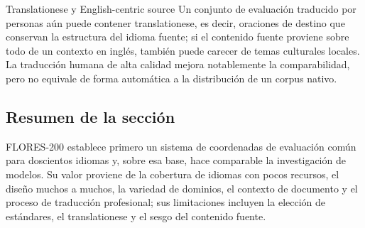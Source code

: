 \begin{warningbox}{Translationese y English-centric source}
Un conjunto de evaluación traducido por personas aún puede contener translationese, es decir, oraciones de destino que conservan la estructura del idioma fuente; si el contenido fuente proviene sobre todo de un contexto en inglés, también puede carecer de temas culturales locales. La traducción humana de alta calidad mejora notablemente la comparabilidad, pero no equivale de forma automática a la distribución de un corpus nativo.
\end{warningbox}

\subsection{Resumen de la sección}

FLORES-200 establece primero un sistema de coordenadas de evaluación común para doscientos idiomas y, sobre esa base, hace comparable la investigación de modelos. Su valor proviene de la cobertura de idiomas con pocos recursos, el diseño muchos a muchos, la variedad de dominios, el contexto de documento y el proceso de traducción profesional; sus limitaciones incluyen la elección de estándares, el translationese y el sesgo del contenido fuente.
